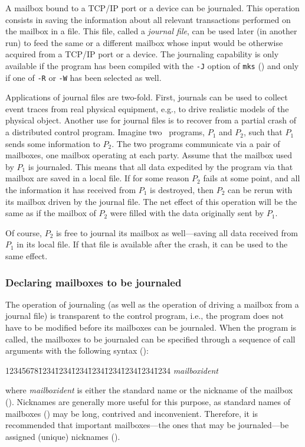 A mailbox bound to a TCP/IP port or a device can be journaled.
This operation consists in saving the information about all relevant
transactions performed on the mailbox in a file.
This file, called a {\em journal file}, can be used later (in another run)
to feed the same or a different mailbox
whose input would be otherwise acquired from a TCP/IP port or a device.
The journaling capability is only available if the program has been
compiled with the {\tt -J} option of {\tt mks} () and
only if one of {\tt -R} or {\tt -W} has been selected as well.

Applications of journal files are two-fold.
First, journals
can be used to collect event traces from real physical equipment, e.g.,
to drive realistic models of the physical object.
Another use for journal files is to recover from a
partial crash of a distributed control program.
Imagine two \smurph\ programs,
$P_1$ and $P_2$,
such that
$P_1$
sends some information to
$P_2$.
The two programs communicate via a pair of mailboxes, one mailbox
operating at each party.
Assume that the mailbox used by
$P_1$
is journaled.
This means that all data expedited by the program via that mailbox are
saved in a local file.
If for some reason
$P_2$
fails at some point, and all
the information it has received from
$P_1$
is destroyed,
then
$P_2$
can be rerun with its mailbox driven by
the journal file.
The net effect of this operation will be the same as if the mailbox of
$P_2$
were filled with the data originally sent by
$P_1$.

Of course,
$P_2$
is free to journal its mailbox as well---saving
all data received from
$P_1$
in its local file.
If that file is available after the crash, it can be used to the same
effect.

\subsubsection{Declaring mailboxes to be journaled}
\label{rm_mb_ju_dm}

The operation of journaling (as well as the operation of driving a mailbox
from a journal file) is transparent to the control program, i.e., the
program does not have to be modified before its mailboxes can be journaled.
When the program is called, the mailboxes to be journaled can be specified
through a sequence of call arguments with the following syntax
():
{\tt\begin{tabbing}
12345678\=1234\=1234\=1234\=1234\=1234\=1234\=1234\=1234\kill
{} {\em mailboxident\/}
\end{tabbing}}
where {\em mailboxident\/} is either the standard name or the nickname
of the mailbox ().
Nicknames are generally more useful for this purpose, as standard names of
mailboxes () may be long, contrived and inconvenient.
Therefore, it is recommended that important mailboxes---the ones
that may be journaled---be assigned (unique) nicknames ().

